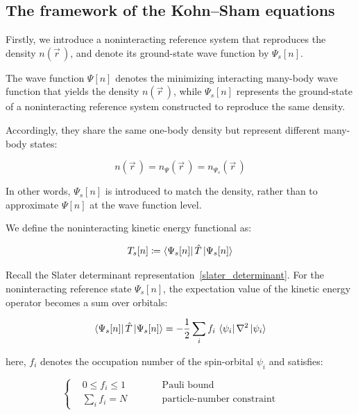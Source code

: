 \subsection{The framework of the Kohn--Sham equations}

Firstly, we introduce a noninteracting reference system that reproduces the density $n(\vec{r}\,)$, and denote its ground-state wave function by $\Psi_s[n]$.

The wave function $\Psi[n]$ denotes the minimizing interacting many-body wave function that yields the density $n(\vec{r}\,)$,
while $\Psi_s[n]$ represents the ground-state of a noninteracting reference system constructed to reproduce the same density.

Accordingly, they share the same one-body density but represent different many-body states:

\begin{equation}
n(\vec{r}\,) = n_{\Psi}(\vec{r}\,) = n_{\Psi_s}(\vec{r}\,)
\label{density_equal_Psi_Psis}
\end{equation}

In other words, $\Psi_s[n]$ is introduced to match the density, rather than to approximate $\Psi[n]$ at the wave function level.

We define the noninteracting kinetic energy functional as:

\begin{equation}
    T_s[n]\coloneqq\bra{\Psi_s[n]}\hat{T}\ket{\Psi_s[n]}
\label{Ts_definition}
\end{equation}

Recall the Slater determinant representation~\eqref{slater_determinant}.
For the noninteracting reference state $\Psi_s[n]$,
the expectation value of the kinetic energy operator becomes a sum over orbitals:

\begin{equation}
    \bra{\Psi_s[n]}\hat{T}\ket{\Psi_s[n]}
    = -\frac{1}{2}\sum_i f_i\,\bra{\psi_i}\nabla^2\ket{\psi_i} 
\label{Ts_orbital_sum}
\end{equation}

here, $f_i$ denotes the occupation number of the spin-orbital $\psi_i$ and satisfies:

\begin{equation}
\left\{
\begin{aligned}
    &0\le f_i\le 1              &&\qquad  \text{Pauli bound} \\
    &\textstyle{\sum_i}f_i = N  &&\qquad  \text{particle-number constraint}
\end{aligned}
\right.
\qquad
\label{occupation_constraints}
\end{equation}

